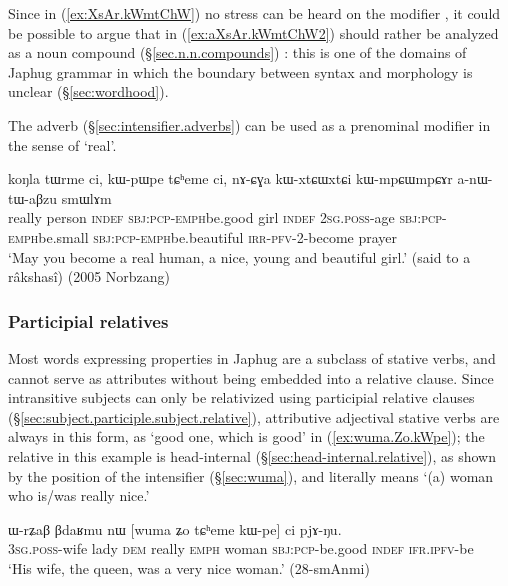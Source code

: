 Since in (\ref{ex:XsAr.kWmtChW}) no stress can be heard on the modifier , it could be possible to argue that  in  (\ref{ex:aXsAr.kWmtChW2}) should rather be analyzed as a noun compound (§\ref{sec.n.n.compounds}) : this is one of the domains of Japhug grammar in which the boundary between syntax and morphology is unclear (§\ref{sec:wordhood}).

The adverb  (§\ref{sec:intensifier.adverbs}) can be used as a prenominal modifier in the sense of `real'.

\begin{exe}
\ex \label{ex:koNla.tWrme}
\gll koŋla tɯrme ci, kɯ-pɯ\redp{}pe tɕʰeme ci,  nɤ-ɕɣa kɯ-xtɕɯ\redp{}xtɕi kɯ-mpɕɯ\redp{}mpɕɤr a-nɯ-tɯ-aβzu smɯlɤm \\
really person \textsc{indef} \textsc{sbj}:\textsc{pcp}-\textsc{emph}\redp{}be.good girl \textsc{indef} \textsc{2sg}.\textsc{poss}-age \textsc{sbj}:\textsc{pcp}-\textsc{emph}\redp{}be.small \textsc{sbj}:\textsc{pcp}-\textsc{emph}\redp{}be.beautiful \textsc{irr}-\textsc{pfv}-2-become prayer \\
\glt `May you become a real human, a nice, young and beautiful girl.' (said to a râkshasî) (2005 Norbzang)
\end{exe}

\subsubsection{Participial relatives} \label{ex:attributive.participles.stative.verbs}
 
Most words expressing properties in Japhug are a subclass of stative verbs, and cannot serve as attributes without being embedded into a relative clause. Since intransitive subjects can only be relativized using  participial relative clauses (§\ref{sec:subject.participle.subject.relative}), attributive adjectival stative verbs are always in this form, as  `good one, which is good' in (\ref{ex:wuma.Zo.kWpe}); the relative   in this example is head-internal (§\ref{sec:head-internal.relative}), as shown by the position of the intensifier  (§\ref{sec:wuma}), and literally means `(a) woman who is/was really nice.'

\begin{exe}
   \ex  \label{ex:wuma.Zo.kWpe}
\gll  ɯ-rʑaβ βdaʁmu nɯ [wuma ʑo tɕʰeme kɯ-pe] ci pjɤ-ŋu. \\
\textsc{3sg}.\textsc{poss}-wife lady \textsc{dem} really \textsc{emph} woman \textsc{sbj}:\textsc{pcp}-be.good \textsc{indef} \textsc{ifr}.\textsc{ipfv}-be \\
\glt `His wife, the queen, was a very nice woman.' (28-smAnmi)
\end{exe}  

